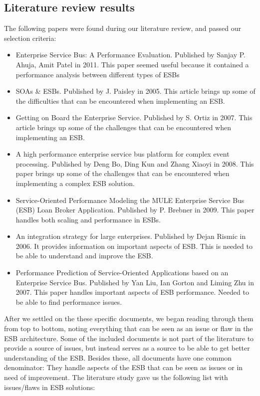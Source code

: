 \documentclass{llncs}
\begin{document}
\subsection{Literature review results}

The following papers were found during our literature review, and passed our selection criteria:
\begin{itemize}
\item Enterprise Service Bus: A Performance Evaluation. Published by Sanjay P. Ahuja, Amit Patel in 2011. This paper seemed useful because it contained a performance analysis between different types of ESBs
\item SOAs \& ESBs. Published by J. Paisley in 2005. This article brings up some of the difficulties that can be encountered when implementing an ESB.
\item Getting on Board the Enterprise Service. Published by S. Ortiz in 2007. This article brings up some of the challenges that can be encountered when implementing an ESB.
\item A high performance enterprise service bus platform for complex event processing. Published by Deng Bo,  Ding Kun and Zhang Xiaoyi in 2008. This paper brings up some of the challenges that can be encountered when implementing a complex ESB solution.
\item Service-Oriented Performance Modeling the MULE Enterprise Service Bus (ESB) Loan Broker Application. Published by P. Brebner in 2009. This paper handles both scaling and performance in ESBs.
\item An integration strategy for large enterprises. Published by Dejan Rismic in 2006. It provides information on important aspects of ESB. This is needed to be able to understand and improve the ESB.
\item Performance Prediction of Service-Oriented Applications based on an Enterprise Service Bus. Published by Yan Liu, Ian Gorton and Liming Zhu in 2007. This paper handles important aspects of ESB performance. Needed to be able to find performance issues.
\end{itemize}

After we settled on the these specific documents, we began reading through them from top to bottom, noting everything that can be seen as an issue or flaw in the ESB architecture.
Some of the included documents is not part of the literature to provide a source of issues, but instead serves as a source to be able to get better understanding of the ESB.
Besides these, all documents have one common denominator: They handle aspects of the ESB that can be seen as issues or in need of improvement.
The literature study gave us the following list with issues/flaws in ESB solutions:
\end{document}
